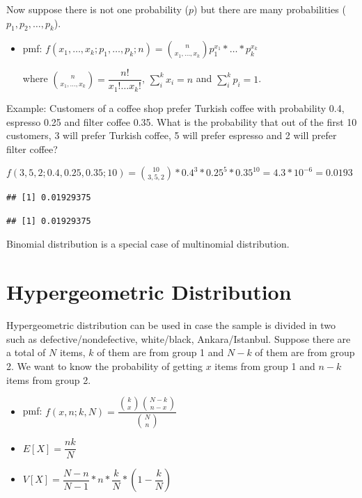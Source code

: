 \documentclass[]{book}
\theoremstyle{definition}
\theoremstyle{definition}
\theoremstyle{definition}
\theoremstyle{remark}
\begin{document}
Now suppose there is not one probability (\(p\)) but there are many
probabilities (\(p_1, p_2, \dots, p_k\)).

\begin{itemize}
\item
  pmf:
  \(f(x_1, \dots , x_k;p_1, \dots, p_k;n) = \binom{n}{x_1, \dots , x_k} p_1^{x_1}*\dots *p_k^{x_k}\)

  where \(\binom{n}{x_1, \dots , x_k} = \dfrac{n!}{x_1! \dots x_k!}\),
  \(\sum_i^k x_i = n\) and \(\sum_i^k p_i = 1\).
\end{itemize}

Example: Customers of a coffee shop prefer Turkish coffee with
probability 0.4, espresso 0.25 and filter coffee 0.35. What is the
probability that out of the first 10 customers, 3 will prefer Turkish
coffee, 5 will prefer espresso and 2 will prefer filter coffee?

\(f(3,5,2;0.4,0.25,0.35;10) = \binom{10}{3,5,2} * 0.4^3 * 0.25^5 * 0.35^10 = 4.3 * 10^{-6} = 0.0193\)

\begin{verbatim}
## [1] 0.01929375
\end{verbatim}

\begin{verbatim}
## [1] 0.01929375
\end{verbatim}

Binomial distribution is a special case of multinomial distribution.

\hypertarget{hypergeometric-distribution}{%
\section{Hypergeometric
Distribution}\label{hypergeometric-distribution}}

Hypergeometric distribution can be used in case the sample is divided in
two such as defective/nondefective, white/black, Ankara/Istanbul.
Suppose there are a total of \(N\) items, \(k\) of them are from group 1
and \(N-k\) of them are from group 2. We want to know the probability of
getting \(x\) items from group 1 and \(n-k\) items from group 2.

\begin{itemize}
\item
  pmf:
  \(f(x,n;k,N) = \dfrac{\binom{k}{x}\binom{N-k}{n-x}}{\binom{N}{n}}\)
\item
  \(E[X] = \dfrac{nk}{N}\)
\item
  \(V[X] = \dfrac{N-n}{N-1}*n*\dfrac{k}{N}*(1-\dfrac{k}{N})\)
\end{itemize}
\end{document}

